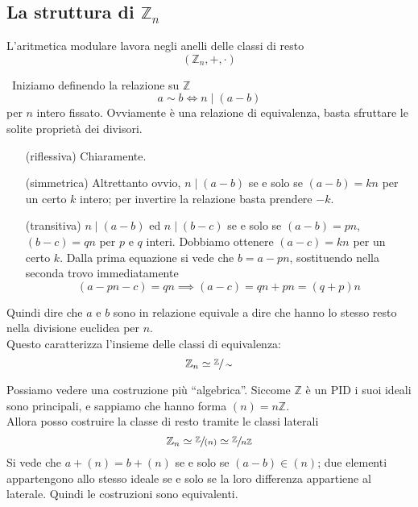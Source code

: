 \subsection{La struttura di $\mathbb{Z}_n$}
L'aritmetica modulare lavora negli anelli delle classi di resto
\begin{equation*}
\left(\mathbb{Z}_n,+,\cdot\right)
\end{equation*}
\begin{osservazione}\
	Iniziamo definendo la relazione su $\mathbb{Z}$ 
	\begin{equation*}
	a\sim b \iff n \mid (a-b) 
	\end{equation*}
	per $n$ intero fissato. Ovviamente è una relazione di equivalenza, basta sfruttare le solite proprietà dei divisori. 
	\begin{itemize}
		\item[(riflessiva)] Chiaramente.
		\item[(simmetrica)] Altrettanto ovvio, $n\mid(a-b)$ se e solo se $(a-b)=kn$ per un certo $k$ intero; per invertire la relazione basta prendere $-k$.
		\item[(transitiva)] $n\mid(a-b)$ ed $n\mid(b-c)$ se e solo se $(a-b)=pn$, $(b-c)=qn$ per $p$ e $q$ interi. Dobbiamo ottenere $(a-c)=kn$ per un certo $k$. Dalla prima equazione si vede che $b=a-pn$, sostituendo nella seconda trovo immediatamente
		\begin{equation*}
		(a-pn-c)=qn\implies (a-c)=qn+pn=(q+p)n
		\end{equation*}
	\end{itemize}
	Quindi dire che $a$ e $b$ sono in relazione equivale a dire che hanno lo stesso resto nella divisione euclidea per $n$. \\ Questo caratterizza l'insieme delle classi di equivalenza:
	\begin{equation*}
	\mathbb{Z}_n \simeq \sfrac{\mathbb{Z}}{\sim}
	\end{equation*}
\end{osservazione}
\begin{osservazione}
	Possiamo vedere una costruzione più \enquote{algebrica}. Siccome $\mathbb{Z}$ è un PID i suoi ideali sono principali, e sappiamo che hanno forma $(n)=n\mathbb{Z}$. \\ Allora posso costruire la classe di resto tramite le classi laterali
		\begin{equation*}
		\mathbb{Z}_n\simeq\sfrac{\mathbb{Z}}{(n)}\simeq\sfrac{\mathbb{Z}}{n\mathbb{Z}}
		\end{equation*}
		Si vede che $a+(n)=b+(n)$ se e solo se $(a-b)\in(n)$; due elementi appartengono allo stesso ideale se e solo se la loro differenza appartiene al laterale. Quindi le costruzioni sono equivalenti.

\end{osservazione}

